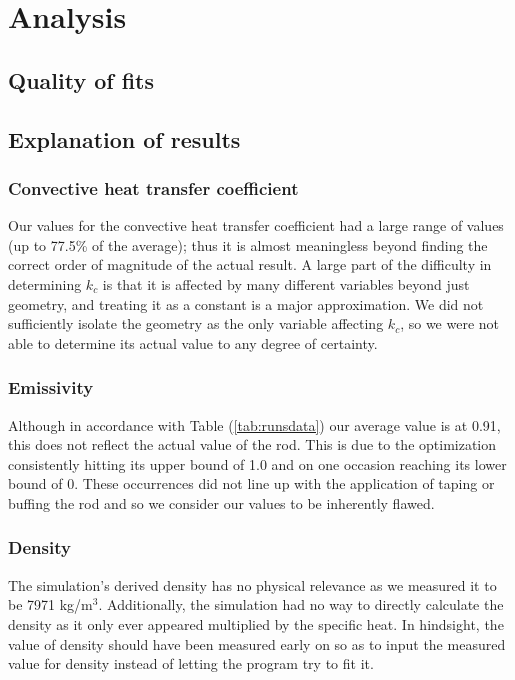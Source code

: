 \documentclass[letterpaper,titlepage,oneside]{report}
\begin{document}
\chapter{Analysis}
\label{ch:analysis}

\section{Quality of fits}

\section{Explanation of results}

\subsection* {Convective heat transfer coefficient}
Our values for the convective heat transfer coefficient had a
large range of values (up to 77.5\% of the average); thus it is
almost meaningless beyond finding the correct order of
magnitude of the actual result.
A large part of the difficulty in determining $k_c$ is that it is
affected by many different variables beyond just geometry,
and treating it as a constant is a major approximation.
We did not sufficiently isolate the geometry as the only variable
affecting $k_c$, so we were not able to determine its actual value
to any degree of certainty.

\subsection* {Emissivity}
Although in accordance with Table (\ref{tab:runsdata}) our average
value is at 0.91, this does not reflect the
actual value of the rod. This is due to the optimization
consistently hitting its upper bound of 1.0 and on one
occasion reaching its lower bound of 0.
These occurrences did not line up with the application of taping
or buffing the rod and so we consider our values to be inherently
flawed.

\subsection* {Density}
The simulation's derived density has no physical relevance as we
measured it to be 7971 kg/m$^3$. Additionally, the simulation had
no way to directly calculate the density as it only ever
appeared multiplied by the specific heat.
In hindsight, the value of density should have been measured early on
so as to input the measured value for density instead of
letting the program try to fit it.
\end{document}
